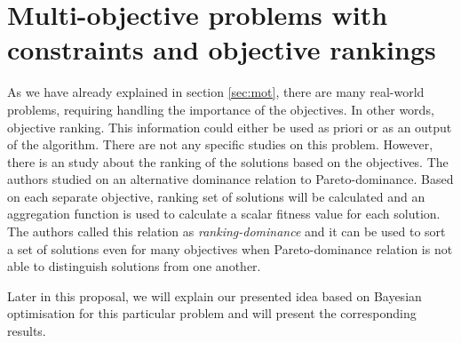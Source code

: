 \section{Multi-objective problems with constraints and objective rankings}
As we have already explained in section \ref{sec:mot}, there are many real-world problems, requiring handling the importance of the objectives. In other words, objective ranking. This information could either be used as priori or as an output of the algorithm. There are not any specific studies on this problem. However, there is an study \cite{kukkonen2007ranking} about the ranking of the solutions based on the objectives. 
The authors studied on an alternative dominance relation to Pareto-dominance. Based on each separate objective, ranking set of solutions will be calculated and an aggregation function is used to calculate a scalar fitness value for each solution. The authors called this relation as \textit{ranking-dominance} and it can be used to sort a set of solutions even for many objectives when Pareto-dominance relation is not able to distinguish solutions from one another. 
\par
Later in this proposal, we will explain our presented idea based on Bayesian optimisation for this particular problem and will present the corresponding results.